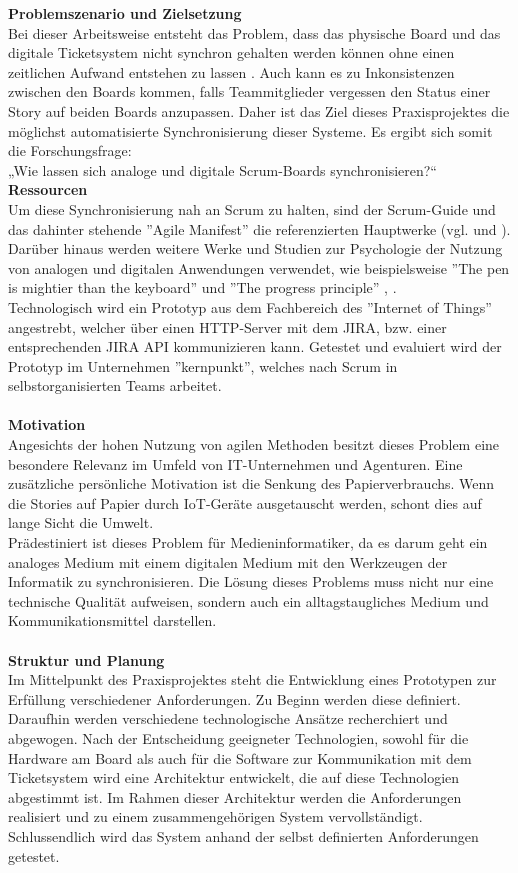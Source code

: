 \documentclass[12pt,titlepage]{scrartcl}
\begin{document}
\textbf{Problemszenario und Zielsetzung} \\
Bei dieser Arbeitsweise entsteht das Problem, dass das physische Board und das digitale Ticketsystem nicht synchron gehalten werden können ohne einen zeitlichen Aufwand entstehen zu lassen \cite{sync}. Auch kann es zu Inkonsistenzen zwischen den Boards kommen, falls Teammitglieder vergessen den Status einer Story auf beiden Boards anzupassen. Daher ist das Ziel dieses Praxisprojektes die möglichst automatisierte Synchronisierung dieser Systeme. Es ergibt sich somit die Forschungsfrage: \\
„Wie lassen sich analoge und digitale Scrum-Boards synchronisieren?“
\newpage
\noindent
\textbf{Ressourcen} \\
Um diese Synchronisierung nah an Scrum zu halten, sind der Scrum-Guide und das dahinter stehende ''Agile  Manifest'' die referenzierten Hauptwerke (vgl. \cite{manifest} und \cite{guide}). Darüber hinaus werden weitere Werke und Studien zur Psychologie der Nutzung von analogen und digitalen Anwendungen verwendet, wie beispielsweise ''The pen is mightier than the keyboard'' und ''The progress principle'' \cite{pen}, \cite{progress}. \\
Technologisch wird ein Prototyp aus dem Fachbereich des ''Internet of Things'' angestrebt, welcher über einen HTTP-Server mit dem JIRA, bzw. einer entsprechenden JIRA API kommunizieren kann. Getestet und evaluiert wird der Prototyp im Unternehmen ''kernpunkt'', welches nach Scrum in selbstorganisierten Teams arbeitet.\\ \\
\textbf{Motivation} \\
Angesichts der hohen Nutzung von agilen Methoden besitzt dieses Problem eine besondere Relevanz im Umfeld von IT-Unternehmen und Agenturen. Eine zusätzliche persönliche Motivation ist die Senkung des Papierverbrauchs. Wenn die Stories auf Papier durch IoT-Geräte ausgetauscht werden, schont dies auf lange Sicht die Umwelt. \\
Prädestiniert ist dieses Problem für Medieninformatiker, da es darum geht ein analoges Medium mit einem digitalen Medium mit den Werkzeugen der Informatik zu synchronisieren. Die Lösung dieses Problems muss nicht nur eine technische Qualität aufweisen, sondern auch ein alltagstaugliches Medium und Kommunikationsmittel darstellen.\\ \\
\textbf{Struktur und Planung} \\
Im Mittelpunkt des Praxisprojektes steht die Entwicklung eines Prototypen zur Erfüllung verschiedener Anforderungen. Zu Beginn werden diese definiert. Daraufhin werden verschiedene technologische Ansätze recherchiert und abgewogen. Nach der Entscheidung geeigneter Technologien, sowohl für die Hardware am Board als auch für die Software zur Kommunikation mit dem Ticketsystem wird eine Architektur entwickelt, die auf diese Technologien abgestimmt ist. Im Rahmen dieser Architektur werden die Anforderungen realisiert und zu einem zusammengehörigen System vervollständigt. Schlussendlich wird das System anhand der selbst definierten Anforderungen getestet.\\ \\
\end{document}
